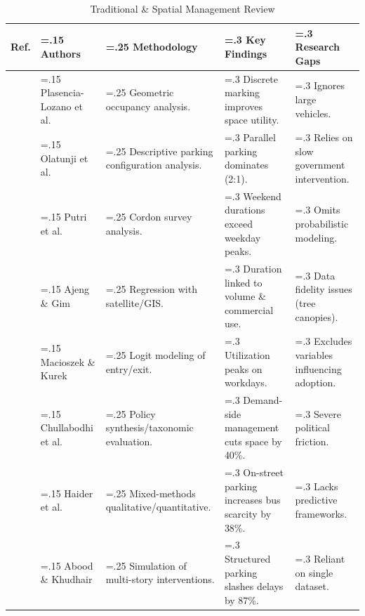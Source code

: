 \documentclass[conference]{IEEEtran}
\begin{document}
\begin{table}[!htbp]
\caption{Traditional \& Spatial Management Review}
\label{tab:traditional}
\centering
\begin{tabularx}{\textwidth}{@{} l >{\hsize=.15\hsize}X >{\hsize=.25\hsize}X >{\hsize=.3\hsize}X >{\hsize=.3\hsize}X @{}}
\toprule
\textbf{Ref.} & \textbf{Authors} & \textbf{Methodology} & \textbf{Key Findings} & \textbf{Research Gaps} \\
\midrule
\cite{b24} & Plasencia-Lozano et al. & Geometric occupancy analysis. & Discrete marking improves space utility. & Ignores large vehicles. \\
\cite{b9} & Olatunji et al. & Descriptive parking configuration analysis. & Parallel parking dominates (2:1). & Relies on slow government intervention. \\
\cite{b25} & Putri et al. & Cordon survey analysis. & Weekend durations exceed weekday peaks. & Omits probabilistic modeling. \\
\cite{b8} & Ajeng \& Gim & Regression with satellite/GIS. & Duration linked to volume \& commercial use. & Data fidelity issues (tree canopies). \\
\cite{b37} & Macioszek \& Kurek & Logit modeling of entry/exit. & Utilization peaks on workdays. & Excludes variables influencing adoption. \\
\cite{b15} & Chullabodhi et al. & Policy synthesis/taxonomic evaluation. & Demand-side management cuts space by 40\%. & Severe political friction. \\
\cite{b17} & Haider et al. & Mixed-methods qualitative/quantitative. & On-street parking increases bus scarcity by 38\%. & Lacks predictive frameworks. \\
\cite{b36} & Abood \& Khudhair & Simulation of multi-story interventions. & Structured parking slashes delays by 87\%. & Reliant on single dataset. \\
\bottomrule
\end{tabularx}
\end{table}
\end{document}

